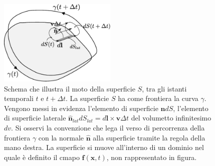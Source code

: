 \vspace{-0.5cm}
\begin{figure}[h]%
 \centering
 \includegraphics[width=0.50\textwidth]{./fig/flux.eps}
 \caption{Schema che illustra il moto della superficie $S$, tra gli istanti temporali $t$ e 
        $t+\Delta t$. La superficie $S$ ha come frontiera la curva $\gamma$.
        Vengono messi in evidenza l'elemento di superficie $\bm{\hat{n}}dS$,
        l'elemento di superficie laterale $\bm{\hat{n}}_{lat} dS_{lat} = 
        d\bm{l}\times \bm{v}\Delta t$ del volumetto infinitesimo $dv$. 
        Si osservi la convenzione che lega il verso di percorrenza della 
        frontiera $\gamma$ con la normale $\bm{\hat{n}}$ alla superficie
        tramite la regola della mano destra. La superficie si muove 
        all'interno di un dominio nel quale è definito il cmapo
        $\bm{f}(\bm{x},t)$, non rappresentato in figura.}
\label{fig:flux}
\end{figure} 

